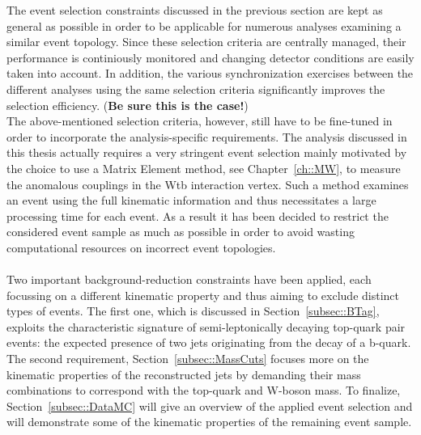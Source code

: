 The event selection constraints discussed in the previous section are kept as general as possible in order to be applicable for numerous analyses examining a similar event topology.
Since these selection criteria are centrally managed, their performance is continiously monitored and changing detector conditions are easily taken into account.
In addition, the various synchronization exercises between the different analyses using the same selection criteria significantly improves the selection efficiency. (\textbf{Be sure this is the case!})
\\

The above-mentioned selection criteria, however, still have to be fine-tuned in order to incorporate the analysis-specific requirements.
The analysis discussed in this thesis actually requires a very stringent event selection mainly motivated by the choice to use a Matrix Element method, see Chapter~\ref{ch::MW}, to measure the anomalous couplings in the Wtb interaction vertex. Such a method examines an event using the full kinematic information and thus necessitates a large processing time for each event. As a result it has been decided to restrict the considered event sample as much as possible in order to avoid wasting computational resources on incorrect event topologies.
\\
\\
Two important background-reduction constraints have been applied, each focussing on a different kinematic property and thus aiming to exclude distinct types of events. 
The first one, which is discussed in Section~\ref{subsec::BTag}, exploits the characteristic signature of semi-leptonically decaying top-quark pair events: the expected presence of two jets originating from the decay of a b-quark. The second requirement, Section~\ref{subsec::MassCuts} focuses more on the kinematic properties of the reconstructed jets by demanding their mass combinations to correspond with the top-quark and W-boson mass.
To finalize, Section~\ref{subsec::DataMC} will give an overview of the applied event selection and will demonstrate some of the kinematic properties of the remaining event sample.

